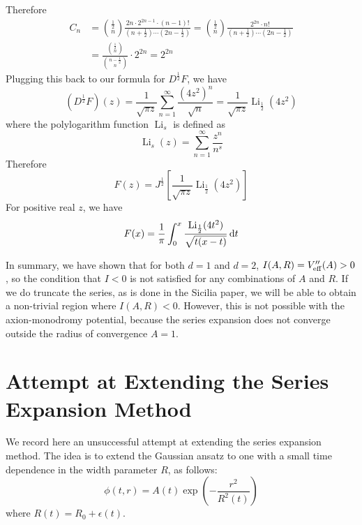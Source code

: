\documentclass{report}
\DeclareMathOperator{\Li}{Li}
\begin{document}
Therefore
\begin{equation}
  \begin{split}
    C_n &= \binom{\frac{1}{2}}{n}\frac{2n\cdot 2^{2n-1} \cdot(n-1)!}{\left(n+\frac{1}{2}\right)\cdots\left(2n-\frac{1}{2}\right)} = \binom{\frac{1}{2}}{n}\frac{2^{2n}\cdot n!}{\left(n+\frac{1}{2}\right)\cdots\left(2n-\frac{1}{2}\right)}\\
    &=\frac{\binom{\frac{1}{2}}{n}}{\binom{n-\frac{1}{2}}{n}}\cdot2^{2n} = 2^{2n}
  \end{split}
\end{equation}
Plugging this back to our formula for $D^\frac{1}{2}F$, we have
\begin{equation}
  (D^\frac{1}{2}F)(z) = \frac{1}{\sqrt{\pi z}} \sum^\infty_{n=1} \frac{(4z^2)^n}{\sqrt{n}} = \frac{1}{\sqrt{\pi z}}\Li_{\frac{1}{2}}(4z^2)
\end{equation}
where the polylogarithm function $\Li_s$ is defined as
\begin{equation}
  \Li_s(z) = \sum^\infty_{n=1}\frac{z^n}{n^s}
\end{equation}
Therefore
\begin{equation}
  F(z) = J^\frac{1}{2}\left[\frac{1}{\sqrt{\pi z}}\Li_{\frac{1}{2}}(4z^2)\right]
\end{equation}
For positive real $z$, we have
\begin{equation}
  F(x) = \frac{1}{\pi}\int^x_0\frac{\Li_{\frac{1}{2}}(4t^2)}{\sqrt{t(x-t)}}\,{\rm d}t
\end{equation}

\bigbreak

In summary, we have shown that for both $d=1$ and $d=2$, $I(A,R) = V''_{\rm eff}(A) > 0$, so the condition that $I<0$ is not satisfied for any combinations of $A$ and $R$. If we do truncate the series, as is done in the Sicilia paper, we will be able to obtain a non-trivial region where $I(A,R)<0$. However, this is not possible with the axion-monodromy potential, because the series expansion does not converge outside the radius of convergence $A = 1$.

\section{Attempt at Extending the Series Expansion Method}
We record here an unsuccessful attempt at extending the series expansion method. The idea is to extend the Gaussian ansatz to one with a small time dependence in the width parameter $R$, as follows:
\begin{equation}
  \phi(t,r) = A(t) \exp \left(-\frac{r^2}{R^2(t)}\right )
\end{equation}
where $R(t) = R_0 + \epsilon(t)$.
\end{document}
